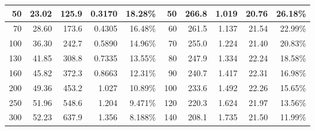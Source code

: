 \documentclass{article}
\begin{document}
\begin{table}[p]
\begin{tabular}{|r|r|r|r|r|r|r|r|r|r|}
        \hline
        50                            & 23.02                                & 125.9                     & 0.3170                    & 18.28\%                   & 50                      & 266.8                     & 1.019                     & 20.76                    & 26.18\% \bigstrut                  \\
        \hline
        70                            & 28.60                                & 173.6                     & 0.4305                    & 16.48\%                   & 60                      & 261.5                     & 1.137                     & 21.54                    & 22.99\% \bigstrut                  \\
        \hline
        100                           & 36.30                                & 242.7                     & 0.5890                    & 14.96\%                   & 70                      & 255.0                     & 1.224                     & 21.40                    & 20.83\% \bigstrut                  \\
        \hline
        130                           & 41.85                                & 308.8                     & 0.7335                    & 13.55\%                   & 80                      & 247.9                     & 1.334                     & 22.24                    & 18.58\% \bigstrut                  \\
        \hline
        160                           & 45.82                                & 372.3                     & 0.8663                    & 12.31\%                   & 90                      & 240.7                     & 1.417                     & 22.31                    & 16.98\% \bigstrut                  \\
        \hline
        200                           & 49.36                                & 453.2                     & 1.027                     & 10.89\%                   & 100                     & 233.6                     & 1.492                     & 22.26                    & 15.65\% \bigstrut                  \\
        \hline
        250                           & 51.96                                & 548.6                     & 1.204                     & 9.471\%                   & 120                     & 220.3                     & 1.624                     & 21.97                    & 13.56\% \bigstrut                  \\
        \hline
        300                           & 52.23                                & 637.9                     & 1.356                     & 8.188\%                   & 140                     & 208.1                     & 1.735                     & 21.50                    & 11.99\% \bigstrut                  \\

\end{tabular}
\end{table}
\end{document}
